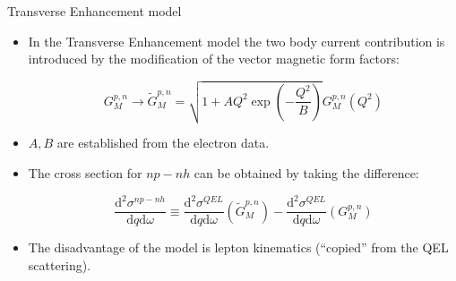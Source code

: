\begin{slide}[toc= TE model]{Transverse Enhancement model}
 
 \begin{itemize}
  
  \vspace{10pt}
  \item In the Transverse Enhancement model the two body current contribution is introduced by the modification of the vector magnetic form factors:
  
  $$G^{p,n}_M \rightarrow \tilde G^{p,n}_M = \sqrt{1 + AQ^2\exp{\left(-\frac{Q^2}{B}\right)}}G^{p,n}_M(Q^2)$$
  
  \item $A, B$ are established from the electron data.
  
  \item The cross section for $np-nh$ can be obtained by taking the difference:
  
  $$\frac{\mbox{d}^2\sigma^{np-nh}}{\mbox{d}q\mbox{d}\omega} \equiv \frac{\mbox{d}^2\sigma^{QEL}}{\mbox{d}q\mbox{d}\omega}(\tilde G^{p,n}_M) - \frac{\mbox{d}^2\sigma^{QEL}}{\mbox{d}q\mbox{d}\omega}(G^{p,n}_M)$$
  
  \item The disadvantage of the model is lepton kinematics (``copied'' from the QEL scattering).
 
 \end{itemize}
 
\end{slide}


